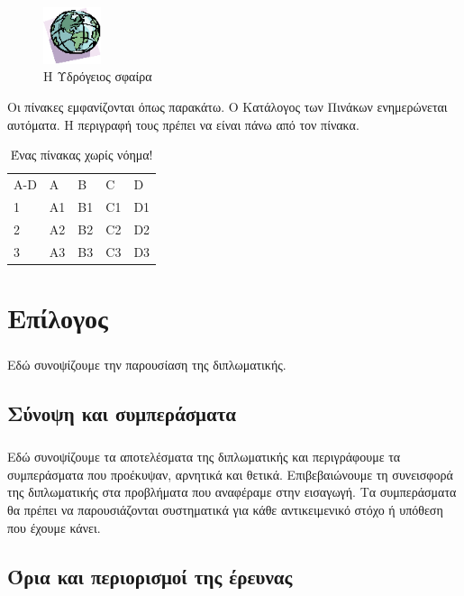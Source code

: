 \documentclass[12pt]{article}
\begin{document}
\begin{figure}[htbp]
\includegraphics[width=0.15\textwidth]{figure1.png}
\captionsetup{justification=raggedright,
singlelinecheck=false
}
\caption{Η Υδρόγειος σφαίρα}
\label{fig:figure1}
\end{figure}

Οι πίνακες εμφανίζονται όπως παρακάτω. Ο Κατάλογος των Πινάκων ενημερώνεται αυτόματα. Η περιγραφή τους πρέπει να είναι πάνω από τον πίνακα.
\begin{table}[htbp]
\captionsetup{justification=raggedright,
singlelinecheck=false
}
\caption{Ένας πίνακας χωρίς νόημα!}
\begin{otherlanguage}{english}
\def\arraystretch{1.5}
\begin{tabular}{| p{2.0cm} | p{2.0cm}| p{2.0cm} | p{2.0cm} | p{2.0cm} |}
\cline{1-5}
A-D & A & B & C & D \\
\cline{1-5}
1 & A1 & B1 & C1 & D1 \\
\cline{1-5}
2 & A2 & B2 & C2 & D2 \\
\cline{1-5}
3 & A3 & B3 & C3 & D3 \\
\cline{1-5}
\end{tabular}
\end{otherlanguage}
\end{table}



\clearpage
\section{Επίλογος}
\subparagraph{}
Εδώ συνοψίζουμε την παρουσίαση της διπλωματικής.

\subsection{Σύνοψη και συμπεράσματα}
\subparagraph{}

Εδώ συνοψίζουμε τα αποτελέσματα της διπλωματικής και περιγράφουμε τα συμπεράσματα που προέκυψαν, αρνητικά και θετικά. Επιβεβαιώνουμε τη συνεισφορά της διπλωματικής στα προβλήματα που αναφέραμε στην εισαγωγή. Τα συμπεράσματα θα πρέπει να παρουσιάζονται συστηματικά για κάθε αντικειμενικό στόχο ή υπόθεση που έχουμε κάνει.

\subsection{Όρια και περιορισμοί της έρευνας}
\end{document}

